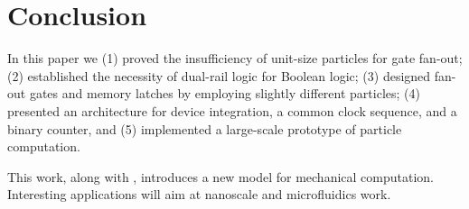 \documentclass[letterpaper, 10 pt, conference]{ieeeconf}
\begin{document}


\section{Conclusion}\label{sec:Conclusion}
In this paper we 
(1) proved the insufficiency of unit-size particles for gate fan-out; 
(2) established the necessity of dual-rail logic for Boolean logic;  
(3) designed {\sc fan-out} gates and memory latches by employing slightly different particles;
 (4) presented an architecture for device integration,  a common clock sequence, and a binary counter,
 and (5) implemented a large-scale prototype of particle computation.

This work, along with \cite{Becker2013f,Becker2014,Becker2014a}, introduces a
new model for mechanical computation.  Interesting applications will aim at 
nanoscale and microfluidics work.

    
   

%
\end{document}
